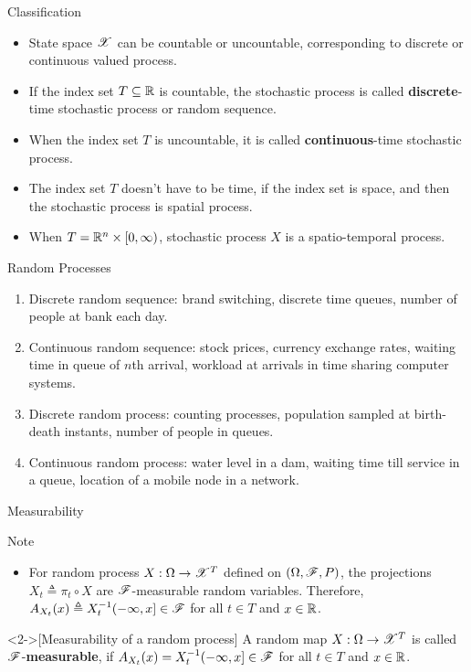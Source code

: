 \documentclass[12pt,aspectratio=169]{beamer}
\begin{document}
\begin{frame}
\begin{block}{Classification}
\begin{itemize}
\item <1-> State space $\mathscr{X}$ can be countable or uncountable, corresponding to discrete or continuous valued process.  
\item <2-> If the index set $T \subseteq \mathbb{R}$ is countable, the stochastic process is called \textbf{discrete}-time stochastic process or random sequence. 
\item <3-> When the index set $T$ is uncountable, it is called \textbf{continuous}-time stochastic process. 
\item <4-> The index set $T$ doesn't have to be time, if the index set is space, and then the stochastic process is spatial process. 
\item <5-> When $T = \mathbb{R}^n \times [0, \infty)$, stochastic process $X$ is a spatio-temporal process. 
\end{itemize}
\end{block}
\end{frame}

\begin{frame}{Random Processes}
\begin{Example} 
\begin{enumerate}[i\_]
\item <1-> Discrete random sequence: brand switching, discrete time queues, number of people at bank each day.
\item <2-> Continuous random sequence: stock prices, currency exchange rates, waiting time in queue of $n$th arrival, workload at arrivals in time sharing computer systems.
\item <3-> Discrete random process:  counting processes, population sampled at birth-death instants, number of people in queues.
\item <4-> Continuous random process: water level in a dam, waiting time till service in a queue, location of a mobile node in a network.
\end{enumerate}
\end{Example}
\end{frame}

\begin{frame}{Measurability}
\begin{block}{Note}
\begin{itemize}
\item <1-> For random process $X:\Omega\to \mathscr{X}^T$ defined on  $(\Omega, \mathscr{F}, P)$, the projections $X_t \triangleq \pi_t\circ X$ are $\mathscr{F}$-measurable random variables. Therefore, $A_{X_t}(x) \triangleq X_t^{-1}(-\infty, x] \in \mathscr{F}$ for all $t \in T$ and $x \in \mathbb{R}$. \end{itemize}
\end{block}
\begin{Definition}<2->[Measurability of a random process] 
A random map $X:\Omega\to\mathscr{X}^T$ is called $\mathscr{F}$-\textbf{measurable},  
if $A_{X_t}(x) = X_t^{-1}(-\infty, x]\in \mathscr{F}$ for all $t \in T$ and $x\in \mathbb{R}$. 
\end{Definition} 
\end{frame}
\end{document}
